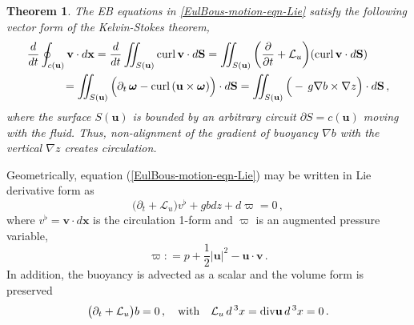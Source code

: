 \documentclass[11pt, oneside]{article}   	%
\numberwithin{equation}{section}
\theoremstyle{plain}
\newtheorem{theorem}{Theorem}[section]
\theoremstyle{definition}
\theoremstyle{remark}
\newcommand{\<}{\langle}
\renewcommand{\>}{\rangle}
\begin{document}


\begin{theorem} \label{Stokes-thm-strat}
The EB equations in \eqref{EulBous-motion-eqn-Lie} satisfy the following vector form  of the Kelvin-Stokes theorem,
\begin{align} 
\begin{split}
\frac{d}{dt}\oint_{c(\mathbf{u})} \mathbf{v} \cdot d \mathbf{x} 
&=
\frac{d}{dt}
\int\!\!\!\!\int_{S(\mathbf{u})}
\mathrm{curl}\,\mathbf{v} \cdot d \mathbf{S}
=
\int\!\!\!\!\int_{S(\mathbf{u})}
\bigg(
\frac{\partial  }{\partial t} 
+ 
 \mathcal{L}_{u}
\bigg)
(\mathrm{curl}\,\mathbf{v} \cdot d \mathbf{S})
   \\&\hspace{-1cm}
   = 
\int\!\!\!\!\int_{S(\mathbf{u})}
\Big(\partial_t \,\boldsymbol{\omega}
-
\mathrm{curl}\,(\mathbf{u}\times \boldsymbol{\omega}) \Big) \cdot d \mathbf{S} 
= 
\int\!\!\!\!\int_{S(\mathbf{u})}
\Big(-\,g\nabla{b}\times\nabla{z}\Big) \cdot d \mathbf{S} 
 \,,
\end{split}
 \label{Stokes-strat-vector}
\end{align} 
where the surface $S(\mathbf{u})$ is bounded by an arbitrary circuit $\partial S=c(\mathbf{u})$ moving with the fluid. 
Thus, non-alignment of the gradient of buoyancy $\nabla{b}$ with the vertical $\nabla{z}$ creates circulation. 
\end{theorem}  

Geometrically, equation (\ref{EulBous-motion-eqn-Lie}) may be written in Lie derivative form as 
 \begin{equation}
\big(\partial_t +  \mathcal{L}_u\big)v^\flat  + gbdz + d\varpi =0
\,,
\label{EulBousseqns-1form}
\end{equation}
where $v^\flat = \mathbf{v}\cdot d \mathbf{x}$ is the circulation 1-form and $\varpi$ is an augmented pressure variable,
 \begin{equation}
 \varpi: = p+\frac{1}{2}|\mathbf{u}|^2
-\mathbf{u}\cdot\mathbf{v}
\,.
\label{varpi-def}
\end{equation}
In addition, the buoyancy is advected as a scalar and the volume form is preserved
 \begin{equation}
\big(\partial_t +  \mathcal{L}_u\big)b = 0
\,,
\quad\hbox{with}\quad
 \mathcal{L}_u\,d\,^3x = \mathrm{div}\mathbf{u}\,d\,^3x = 0
\,.
\label{EulBousseqns-tracers}
\end{equation}
\end{document}
